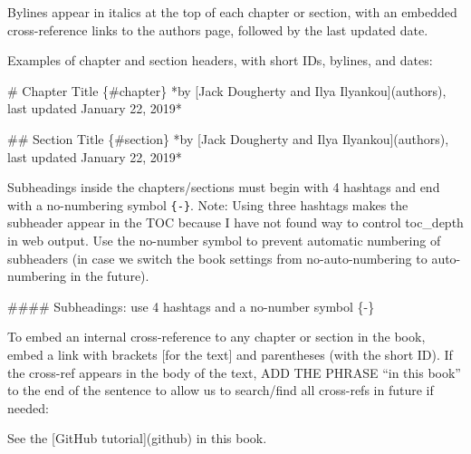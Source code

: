 \documentclass[
  english,
]{book}
\newenvironment{Shaded}{\begin{snugshade}}{\end{snugshade}}
\newcommand{\FunctionTok}[1]{\textcolor[rgb]{0.00,0.00,0.00}{#1}}
\newcommand{\NormalTok}[1]{#1}
\newcommand{\OtherTok}[1]{\textcolor[rgb]{0.56,0.35,0.01}{#1}}
\begin{document}
Bylines appear in italics at the top of each chapter or section, with an embedded cross-reference links to the authors page, followed by the last updated date.

Examples of chapter and section headers, with short IDs, bylines, and dates:

\begin{Shaded}
\begin{Highlighting}[]
\FunctionTok{\# Chapter Title \{\#chapter\}}
\NormalTok{*by [Jack Dougherty and Ilya Ilyankou](authors), last updated January 22, 2019*}
\end{Highlighting}
\end{Shaded}

\begin{Shaded}
\begin{Highlighting}[]
\FunctionTok{\#\# Section Title \{\#section\}}
\NormalTok{*by [Jack Dougherty and Ilya Ilyankou](authors), last updated January 22, 2019*}
\end{Highlighting}
\end{Shaded}

Subheadings inside the chapters/sections must begin with 4 hashtags and end with a no-numbering symbol \texttt{\{-\}}. Note: Using three hashtags makes the subheader appear in the TOC because I have not found way to control toc\_depth in web output. Use the no-number symbol to prevent automatic numbering of subheaders (in case we switch the book settings from no-auto-numbering to auto-numbering in the future).

\begin{Shaded}
\begin{Highlighting}[]
\FunctionTok{\#\#\#\# Subheadings: use 4 hashtags and a no{-}number symbol \{{-}\}}
\end{Highlighting}
\end{Shaded}

To embed an internal cross-reference to any chapter or section in the book, embed a link with brackets {[}for the text{]} and parentheses (with the short ID). If the cross-ref appears in the body of the text, ADD THE PHRASE ``in this book'' to the end of the sentence to allow us to search/find all cross-refs in future if needed:

\begin{Shaded}
\begin{Highlighting}[]
\NormalTok{See the }\OtherTok{[GitHub tutorial](github)}\NormalTok{ in this book.}
\end{Highlighting}
\end{Shaded}
\end{document}
